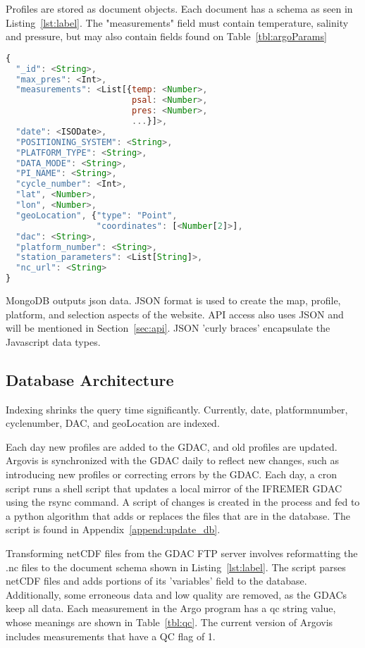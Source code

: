 Profiles are stored as document objects. Each document has a schema as seen in Listing~\ref{lst:label}. The "measurements" field must contain temperature, salinity and pressure, but may also contain fields found on Table~\ref{tbl:argoParams}
\begin{lstlisting}[language=JavaScript, label={lst:label}, caption=JSON schema of mongoDB profile.]
{
  "_id": <String>,
  "max_pres": <Int>,
  "measurements": <List[{temp: <Number>,
                         psal: <Number>,
                         pres: <Number>,
                         ...}]>,
  "date": <ISODate>,
  "POSITIONING_SYSTEM": <String>,
  "PLATFORM_TYPE": <String>,
  "DATA_MODE": <String>,
  "PI_NAME": <String>,
  "cycle_number": <Int>,
  "lat", <Number>,
  "lon", <Number>,
  "geoLocation", {"type": "Point",
                  "coordinates": [<Number[2]>],
  "dac": <String>,
  "platform_number": <String>,
  "station_parameters": <List[String]>, 
  "nc_url": <String>
}
\end{lstlisting}

MongoDB outputs \gls{json} data. JSON format is used to create the map, profile, platform, and selection aspects of the website. API access also uses JSON and will be mentioned in Section~\ref{sec:api}. JSON 'curly braces' encapsulate the Javascript data types. 

\subsection{Database Architecture}

Indexing shrinks the query time significantly. Currently, date, platform\textunderscore number, cycle\textunderscore number, DAC, and geoLocation are indexed.

Each day new profiles are added to the GDAC, and old profiles are updated. Argovis is synchronized with the GDAC daily to reflect new changes, such as introducing new profiles or correcting errors by the GDAC. Each day, a \gls{cron} script runs a shell script that updates a local mirror of the IFREMER GDAC using the \gls{rsync} command. A script of changes is created in the process and fed to a python algorithm that adds or replaces the files that are in the database. The script is found in Appendix~\ref{append:update_db}. 

Transforming netCDF files from the GDAC FTP server involves reformatting the .nc files to the document schema shown in Listing~\ref{lst:label}. The script parses netCDF files and adds portions of its 'variables' field to the database. Additionally, some erroneous data and low quality are removed, as the GDACs keep all data. Each measurement in the Argo program has a \gls{qc} string value, whose meanings are shown in Table~\ref{tbl:qc}. The current version of Argovis includes measurements that have a QC flag of 1.

